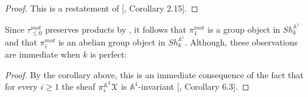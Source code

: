\begin{proof}
    This is a restatement of [\cite{choudhury2022characterisation}, Corollary 2.15].
\end{proof} 


\begin{rem}
    Since $\tau_{\leq0}^{mot}$ preserves products by , it follows that $\pi_1^{mot}$ is a group object in $Sh^{\mathbb{A}^1}_k$ and that $\pi_i^{mot}$ is an abelian group object in $Sh_k^{\mathbb{A}^1}$. Although, these observations are immediate when $k$ is perfect:
\end{rem}

\begin{proof}
By the corollary above, this is an immediate consequence of the fact that for every $i\geq 1$ the sheaf $\pi_i^{\mathbb{A}^1}\EuScript{X}$ is $\mathbb{A}^1$-invariant [\cite{morel2012a1}, Corollary 6.3].  \end{proof}

